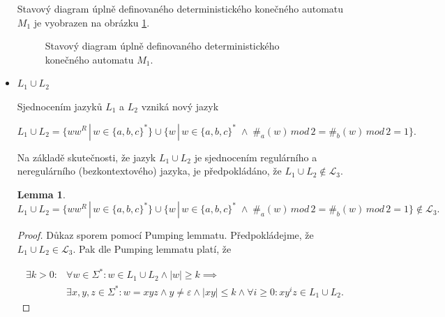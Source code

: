 \documentclass[a4paper, 12pt]{article}
\theoremstyle{definition}
\theoremstyle{definition}
\theoremstyle{definition}
\newtheorem{lemma}[theorem]{Lemma}
\theoremstyle{remark}
\begin{document}
\begin{itemize}
    Stavový diagram úplně definovaného deterministického konečného automatu $M_1$ je vyobrazen na obrázku \ref{fig:m1}.

     \begin{figure}[ht!]
    \begin{center}
        \hspace*{0.15\linewidth}    
        
    \caption{Stavový diagram úplně definovaného deterministického konečného automatu $M_1$.}
    \label{fig:m1}
    \end{center}
    \end{figure}
    \FloatBarrier
    
    \item $L_1 \cup L_2$

    Sjednocením jazyků $L_1$ a $L_2$ vzniká nový jazyk

    $$L_1 \cup L_2 = \{ww^R \, | \, w \in \{a,b,c\}^\ast\} \cup \{w \, | \, w \in \{a,b,c\}^\ast \; \wedge \; \#_a(w) \, mod \, 2 = \#_b(w) \, mod \, 2 = 1\}.$$

    Na základě skutečnosti, že jazyk $L_1 \cup L_2$ je sjednocením regulárního a neregulárního (bezkontextového) jazyka, je předpokládáno, že $L_1 \cup L_2 \notin \mathcal{L}_3$.

    \begin{lemma}
        $L_1 \cup L_2 = \{ww^R \, | \, w \in \{a,b,c\}^\ast\} \cup \{w \, | \, w \in \{a,b,c\}^\ast \; \wedge \; \#_a(w) \, mod \, 2 = \#_b(w) \, mod \, 2 = 1\} \notin \mathcal{L}_3.$
    \end{lemma}

    \begin{proof}
        Důkaz sporem pomocí Pumping lemmatu. Předpokládejme, že $L_1 \cup L_2 \in \mathcal{L}_3$. Pak dle Pumping lemmatu platí, že

        \begin{align*}
            \exists k > 0: &\forall w \in \Sigma^\ast: w \in L_1 \cup L_2 \wedge |w| \geq k \implies \\
            &\exists x, y, z \in \Sigma^\ast: w = xyz \wedge y \neq \varepsilon \wedge |xy| \leq k \wedge \forall i \geq 0: xy^iz \in L_1 \cup L_2.
        \end{align*}


\end{proof}
\end{itemize}
\end{document}
